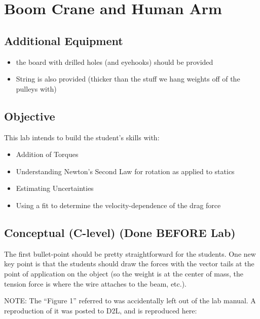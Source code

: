 \documentclass[fleqn,letterpaper]{article}
\begin{document}
\cfoot{}
\headsep=25pt

\section*{Boom Crane and Human Arm}

\subsection*{Additional Equipment}

\begin{itemize}
  \item{the board with drilled holes (and eyehooks) should be provided}
  \item{String is also provided (thicker than the stuff we hang weights off of the pulleys with)}
\end{itemize}

\subsection*{Objective}

This lab intends to build the student's skills with:
%
\begin{itemize}
 \item{Addition of Torques}
 \item{Understanding Newton's Second Law for rotation as applied to statics}
 \item{Estimating Uncertainties}
 \item{Using a fit to determine the velocity-dependence of the drag force}
\end{itemize}
%

\subsection*{Conceptual (C-level) (Done BEFORE Lab)}

The first bullet-point should be pretty straightforward for the students.  One new key point is that the students should draw the forces with the vector tails at the point of application on the object (so the weight is at the center of mass, the tension force is where the wire attaches to the beam, etc.).  

NOTE:  The ``Figure 1'' referred to was accidentally left out of the lab manual.  A reproduction of it was posted to D2L, and is reproduced here:
\end{document}
